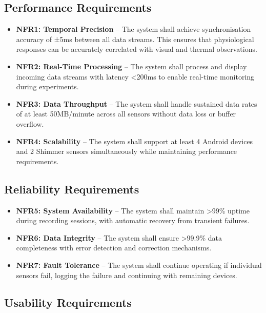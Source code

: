 \subsection{Performance Requirements}

\begin{itemize}
\item \textbf{NFR1: Temporal Precision} -- The system shall achieve synchronisation accuracy of ±5ms between all data streams. This ensures that physiological responses can be accurately correlated with visual and thermal observations.

\item \textbf{NFR2: Real-Time Processing} -- The system shall process and display incoming data streams with latency <200ms to enable real-time monitoring during experiments.

\item \textbf{NFR3: Data Throughput} -- The system shall handle sustained data rates of at least 50MB/minute across all sensors without data loss or buffer overflow.

\item \textbf{NFR4: Scalability} -- The system shall support at least 4 Android devices and 2 Shimmer sensors simultaneously while maintaining performance requirements.
\end{itemize}

\subsection{Reliability Requirements}

\begin{itemize}
\item \textbf{NFR5: System Availability} -- The system shall maintain >99\% uptime during recording sessions, with automatic recovery from transient failures.

\item \textbf{NFR6: Data Integrity} -- The system shall ensure >99.9\% data completeness with error detection and correction mechanisms.

\item \textbf{NFR7: Fault Tolerance} -- The system shall continue operating if individual sensors fail, logging the failure and continuing with remaining devices.
\end{itemize}

\subsection{Usability Requirements}

